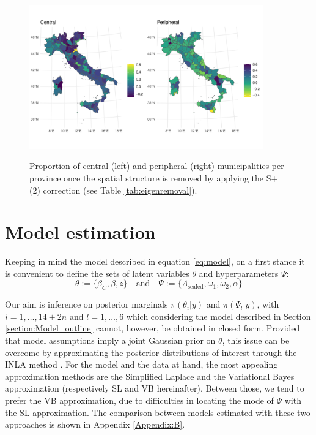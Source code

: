 \documentclass{book}
\begin{document}
\begin{figure}[htbp]
    \centering
    \includegraphics[width=0.9\textwidth]{X_prov_1_nosp_waic.pdf} \\%
    \caption{Proportion of central (left) and peripheral (right) municipalities per province once the spatial structure is removed by applying the S+(2) correction (see Table \ref{tab:eigenremoval}).}
    \label{fig:X_prov_nosp_1}
\end{figure}




\section{Model estimation}\label{section:Method}

Keeping in mind the model described in equation \ref{eq:model}, on a first stance it is convenient to define the sets of latent variables $\theta$ and hyperparameters $\Psi$:
$$
\theta :=  \lbrace \beta_C,  \beta, z  \rbrace  \quad \text{and} \quad
\Psi :=  \lbrace \Lambda_{\mathrm{scaled}}, \omega_1 , \omega_2, \alpha \rbrace
$$

Our aim is inference on posterior marginals $\pi(\theta_i | y)$ and $\pi(\Psi_l | y)$, with $i=1,\ldots, 14 + 2n$ and $l = 1,\ldots, 6$ which considering the model described in Section \ref{section:Model_outline} cannot, however, be obtained in closed form. Provided that model assumptions imply a joint Gaussian prior on $\theta$, this issue can be overcome by approximating the posterior distributions of interest through the INLA method \citep{INLA}. For the model and the data at hand, the most appealing approximation methods are the Simplified Laplace \citep{INLA} and the Variational Bayes \citep{VB} approximation (respectively SL and VB hereinafter).
Between those, we tend to prefer the VB approximation, due to difficulties in locating the mode of $\Psi$ with the SL approximation. The comparison between models estimated with these two approaches is shown in Appendix \ref{Appendix:B}.
\end{document}

